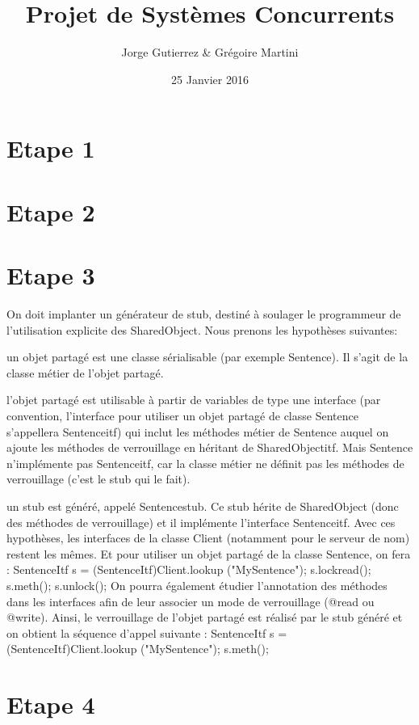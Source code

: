 \documentclass[a4paper,12pt]{article}
\title{Projet de Systèmes Concurrents}
\author{Jorge Gutierrez \& Grégoire Martini}
\date{25 Janvier 2016}
\begin{document}
\maketitle
\tableofcontents
\newpage


\section{Etape 1}


\section{Etape 2}


\section{Etape 3}

On doit  implanter un générateur de stub, destiné à soulager le programmeur de l'utilisation explicite des  SharedObject. 
Nous prenons les hypothèses suivantes:

un  objet  partagé  est  une  classe sérialisable  (par  exemple  Sentence).  Il  s'agit  de  la  classe  métier  de  l'objet partagé.

l'objet  partagé  est  utilisable  à  partir  de  variables  de  type  une interface  (par  convention,  l'interface  pour utiliser  un  objet  partagé  de  classe  Sentence  s'appellera  Sentenceitf)  qui  inclut  les  méthodes  métier  de 
Sentence  auquel  on  ajoute  les  méthodes  de  verrouillage  en  héritant  de  SharedObjectitf.  Mais  Sentence n'implémente pas Sentenceitf, car la classe métier ne définit pas les méthodes de verrouillage (c'est le stub qui le fait).

un  stub  est  généré,  appelé  Sentencestub.  Ce  stub  hérite  de  SharedObject  (donc  des  méthodes  de verrouillage) et  il implémente l'interface Sentenceitf.
Avec ces hypothèses, les interfaces de la classe Client (notamment pour le serveur de nom) restent les mêmes. 
Et pour utiliser un objet partagé de la classe Sentence, on fera :
SentenceItf s = (SentenceItf)Client.lookup ("MySentence");
s.lockread();
s.meth();
s.unlock();
On pourra également étudier l'annotation des méthodes dans les interfaces afin de leur associer un mode de verrouillage (@read ou @write). Ainsi, le verrouillage de l'objet partagé est réalisé par le stub généré et on obtient la 
séquence d'appel suivante
:
SentenceItf s = (SentenceItf)Client.lookup ("MySentence");
s.meth();

\section{Etape 4}
\end{document}
